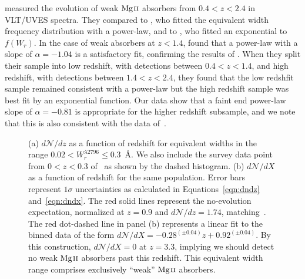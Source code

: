 \cite{Narayanan2007} measured the evolution of weak ${\hbox{{\rm Mg}\kern 0.1em{\sc ii}}}$ absorbers from $0.4 < z < 2.4$ in VLT/UVES spectra. They compared to \cite{Churchill1999}, who fitted the equivalent width frequency distribution with a power-law, and to \cite{Nestor2005}, who fitted an exponential to $f(W_r)$. In the case of weak absorbers at $z < 1.4$, \cite{Narayanan2007} found that a power-law with a slope of $\alpha = -1.04$ is a satisfactory fit, confirming the results of \cite{Churchill1999}. When they split their sample into low redshift, with detections between $0.4 < z < 1.4$, and high redshift, with detections between $1.4 < z < 2.4$, they found that the low redshfit sample remained consistent with a power-law but the high redshift sample was best fit by an exponential function. Our data show that a faint end power-law slope of $\alpha = -0.81$ is appropriate for the higher redshift subsample, and we note that this is also consistent with the data of~\cite{Narayanan2007}.

\begin{figure}[bth]
\caption{(a) $d\mathcal{N}\!/dz$ as a function of redshift for equivalent widths in the range $0.02 < W_{r}^{\lambda2796} \le 0.3$~{\AA}. We also include the survey data point from $0 < z < 0.3$ of~\cite{Narayanan2005} as shown by the dashed histogram. (b) $d\mathcal{N}\!/dX$ as a function of redshift for the same population. Error bars represent $1\sigma$ uncertainties as calculated in Equations~\ref{eqn:dndz} and~\ref{eqn:dndx}. The red solid lines represent the no-evolution expectation, normalized at $z = 0.9$ and $d\mathcal{N}\!/dz = 1.74$, matching~\cite{Narayanan2007}. The red dot-dashed line in panel (b) represents a linear fit to the binned data of the form $d\mathcal{N}\!/dX = -0.28^{(\pm0.04)}z + 0.92^{(\pm0.04)}$. By this construction, $d\mathcal{N}\!/dX = 0$ at $z = 3.3$, implying we should detect no weak ${\hbox{{\rm Mg}\kern 0.1em{\sc ii}}}$ absorbers past this redshift. This equivalent width range comprises exclusively ``weak'' ${\hbox{{\rm Mg}\kern 0.1em{\sc ii}}}$ absorbers.}
\label{fig:dndzbetween}
\end{figure}

